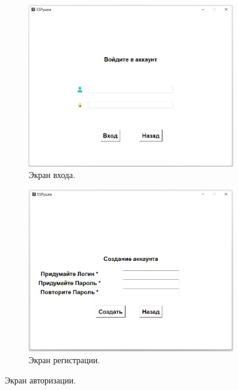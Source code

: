 \documentclass[a4document]{article}
\begin{document}
{\begin{figure}[htp]
  \centering
  \begin{subfigure}[b]{0.5\linewidth}
    \includegraphics[width=\linewidth]{Pics/SignInScreen.jpg}
    \caption{Экран входа.}
  \end{subfigure}
  \begin{subfigure}[b]{0.5\linewidth}
    \includegraphics[width=\linewidth]{Pics/SignUpScreen.jpg}
    \caption{Экран регистрации.}
  \end{subfigure}
  \caption{Экран авторизации.}
  \label{fig:pic3}
\end{figure}

}
\end{document}

